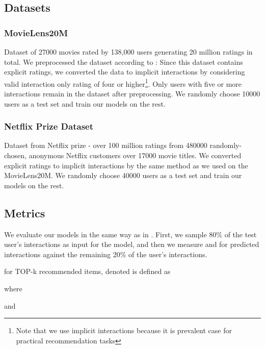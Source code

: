 \documentclass[conference]{IEEEtran}
\begin{document}
    \subsection{Datasets} 
        


        \subsubsection{MovieLens20M \cite{movieLens}} Dataset of 27000 movies rated by 138,000 users generating 20 million ratings in total. We preprocessed the dataset according to \cite{Liang2018}: Since this dataset contains explicit ratings, we converted the data to implicit interactions by considering valid interaction only rating of four or higher\footnote{Note that we use implicit interactions because it is prevalent case for practical recommendation tasks}. Only users with five or more interactions remain in the dataset after preprocessing. We randomly choose 10000 users as a test set and train our models on the rest.
        
        \subsubsection{Netflix Prize Dataset \cite{Bennett2007}} Dataset from Netflix prize - over 100 million ratings from 480000 randomly-chosen, anonymous Netflix customers over 17000 movie titles. We converted explicit ratings to implicit interactions by the same method as we used on the MovieLens20M. We randomly choose 40000 users as a test set and train our models on the rest.
        


    \subsection{Metrics}
        
        We evaluate our models in the same way as in \cite{Liang2018}. First, we sample 80\% of the test user's interactions as input for the model, and then we measure  and  for predicted interactions against the remaining 20\% of the user's interactions. 
        
         for TOP-k recommended items, denoted  is defined as 
        
        
        
        where 
        
        
        
        and     
        
\end{document}
